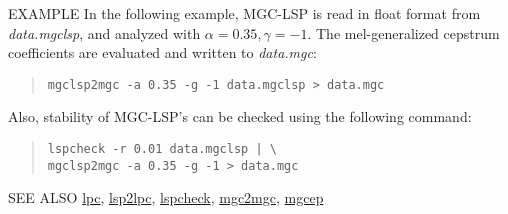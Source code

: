 \begin{qsection}{EXAMPLE}
 In the following example, MGC-LSP is read in float format from
 {\em data.mgclsp}, and analyzed with $\alpha = 0.35, \gamma = -1$. The
 mel-generalized cepstrum coefficients are evaluated and written
 to {\em data.mgc}:
\begin{quote}
\verb!mgclsp2mgc -a 0.35 -g -1 data.mgclsp > data.mgc!
\end{quote}
Also, stability of MGC-LSP's can be checked using the following command:
\begin{quote}
\verb!lspcheck -r 0.01 data.mgclsp | \ ! \\
\verb!mgclsp2mgc -a 0.35 -g -1 > data.mgc!
\end{quote}
\end{qsection}

\begin{qsection}{SEE ALSO}
\hyperlink{lpc}{lpc},
\hyperlink{lsp2lpc}{lsp2lpc},
\hyperlink{lspcheck}{lspcheck},
\hyperlink{mgc2mgc}{mgc2mgc},
\hyperlink{mgcep}{mgcep}
\end{qsection}
